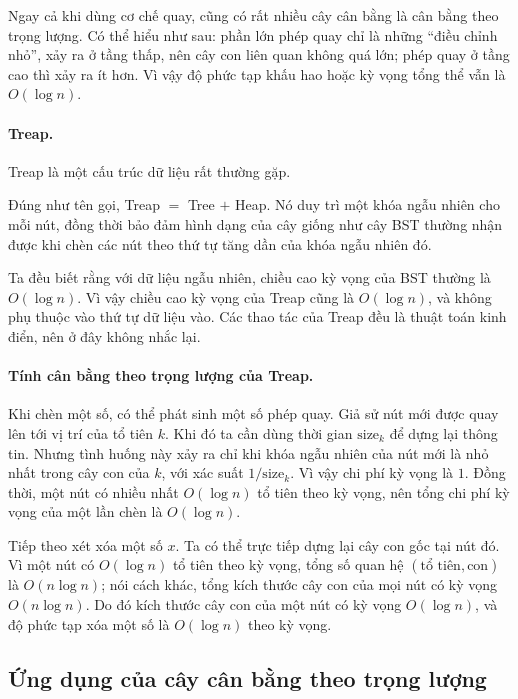 \documentclass[11pt]{article}
\begin{document}
Ngay cả khi dùng cơ chế quay, cũng có rất nhiều cây cân bằng là cân bằng
theo trọng lượng. Có thể hiểu như sau: phần lớn phép quay chỉ là những
``điều chỉnh nhỏ'', xảy ra ở tầng thấp, nên cây con liên quan không quá lớn;
phép quay ở tầng cao thì xảy ra ít hơn. Vì vậy độ phức tạp khấu hao hoặc kỳ
vọng tổng thể vẫn là \(O(\log n)\).

\paragraph{Treap.}
Treap là một cấu trúc dữ liệu rất thường gặp.

Đúng như tên gọi, Treap \(=\) Tree \(+\) Heap. Nó duy trì một khóa ngẫu nhiên
cho mỗi nút, đồng thời bảo đảm hình dạng của cây giống như cây BST thường
nhận được khi chèn các nút theo thứ tự tăng dần của khóa ngẫu nhiên đó.

Ta đều biết rằng với dữ liệu ngẫu nhiên, chiều cao kỳ vọng của BST thường là
\(O(\log n)\). Vì vậy chiều cao kỳ vọng của Treap cũng là \(O(\log n)\), và
không phụ thuộc vào thứ tự dữ liệu vào. Các thao tác của Treap đều là thuật
toán kinh điển, nên ở đây không nhắc lại.

\paragraph{Tính cân bằng theo trọng lượng của Treap.}
Khi chèn một số, có thể phát sinh một số phép quay. Giả sử nút mới được quay
lên tới vị trí của tổ tiên \(k\). Khi đó ta cần dùng thời gian
\(\mathrm{size}_k\) để dựng lại thông tin. Nhưng tình huống này xảy ra chỉ
khi khóa ngẫu nhiên của nút mới là nhỏ nhất trong cây con của \(k\), với xác
suất \(1/\mathrm{size}_k\). Vì vậy chi phí kỳ vọng là \(1\). Đồng thời, một
nút có nhiều nhất \(O(\log n)\) tổ tiên theo kỳ vọng, nên tổng chi phí kỳ
vọng của một lần chèn là \(O(\log n)\).

Tiếp theo xét xóa một số \(x\). Ta có thể trực tiếp dựng lại cây con gốc tại
nút đó. Vì một nút có \(O(\log n)\) tổ tiên theo kỳ vọng, tổng số quan hệ
\((\text{tổ tiên},\text{con})\) là \(O(n\log n)\); nói cách khác, tổng kích
thước cây con của mọi nút có kỳ vọng \(O(n\log n)\). Do đó kích thước cây
con của một nút có kỳ vọng \(O(\log n)\), và độ phức tạp xóa một số là
\(O(\log n)\) theo kỳ vọng.

\subsection{Ứng dụng của cây cân bằng theo trọng lượng}
\end{document}
